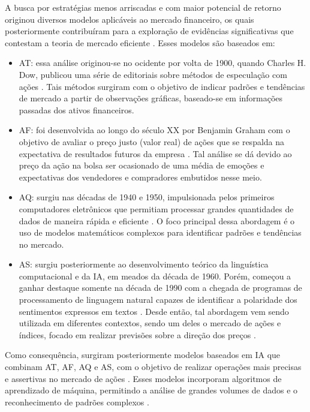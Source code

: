 A busca por estratégias menos arriscadas e com maior potencial de retorno originou diversos modelos aplicáveis ao mercado financeiro, os quais posteriormente contribuíram para a exploração de evidências significativas que contestam a teoria de mercado eficiente \cite{Paul_Proof}. Esses modelos são baseados em:
\begin{itemize}
    \item \ac{AT}: essa análise originou-se no ocidente por volta de 1900, quando Charles H. Dow, publicou uma série de editoriais sobre métodos de especulação com ações \cite{MORRIS1994}. Tais métodos surgiram com o objetivo de indicar padrões e tendências de mercado a partir de observações gráficas, baseado-se em informações passadas dos ativos financeiros. 
    \item \ac{AF}: foi desenvolvida ao longo do século XX por Benjamin Graham \cite{GRAHAM1934} com o objetivo de avaliar o preço justo (valor real) de ações que se respalda na expectativa de resultados futuros da empresa \cite{CAVALCANTE2005}. Tal análise se dá devido ao preço da ação na bolsa ser ocasionado de uma média de emoções e expectativas dos vendedores e compradores embutidos nesse meio. 
    \item \ac{AQ}: surgiu nas décadas de 1940 e 1950, impulsionada pelos primeiros computadores eletrônicos que permitiam processar grandes quantidades de dados de maneira rápida e eficiente \cite{TING2015}. O foco principal dessa abordagem é o uso de modelos matemáticos complexos para identificar padrões e tendências no mercado.   
    \item \ac{AS}: surgiu posteriormente ao desenvolvimento teórico da linguística computacional e da \ac{IA}, em meados da década de 1960. Porém, começou a ganhar destaque somente na década de 1990 com a chegada de programas de processamento de linguagem natural capazes de identificar a polaridade dos sentimentos expressos em textos \cite{SENTIMENTALWILLSON}. Desde então, tal abordagem vem sendo utilizada em diferentes contextos, sendo um deles o mercado de ações e índices, focado em realizar previsões sobre a direção dos preços \cite{SENTIMENTAL2, SENTIMENTAL1, SENTIMENTAL3}. 
\end{itemize}

Como consequência, surgiram posteriormente modelos baseados em \ac{IA} que combinam \ac{AT}, \ac{AF}, \ac{AQ} e \ac{AS}, com o objetivo de realizar operações mais precisas e assertivas no mercado de ações \cite{agrawal2022stock}. Esses modelos incorporam algoritmos de aprendizado de máquina, permitindo a análise de grandes volumes de dados e o reconhecimento de padrões complexos \cite{vadlamudi2017stock}.

